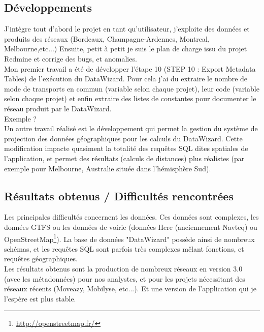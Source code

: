 \begin{itemize}
\subsection{Développements}

J'intègre tout d'abord le projet en tant qu'utilisateur, j'exploite des données et produits des réseaux (Bordeaux, Champagne-Ardennes, Montreal, Melbourne,etc...) Ensuite, petit à petit je suis le plan de charge issu du projet Redmine et corrige des bugs, et anomalies.\\

Mon premier travail a été de développer l'étape 10 (STEP 10 : Export Metadata Tables) de l'exécution du DataWizard. Pour cela j'ai du extraire le nombre de mode de transports en commun (variable selon chaque projet), leur code (variable selon chaque projet) et enfin extraire des listes de constantes pour documenter le réseau produit par le DataWizard.\\

Exemple ?\\

Un autre travail réalisé est le développement qui permet la gestion du système de projection des données géographiques pour les calculs du DataWizard. Cette modification impacte quasiment la totalité des requêtes SQL dites spatiales de l'application, et permet des résultats (calculs de distances) plus réalistes (par exemple pour Melbourne, Australie située dans l'hémisphère Sud).\\


\subsection{Résultats obtenus / Difficultés rencontrées}

Les principales difficultés concernent les données. Ces données sont complexes, les données GTFS ou les données de voirie (données Here (anciennement Navteq) ou OpenStreetMap\footnote{\url{http://openstreetmap.fr/}}). La base de données "DataWizard" possède ainsi de nombreux schémas, et les requêtes SQL sont parfois très complexes mêlant fonctions, et requêtes géographiques.\\

Les résultats obtenus sont la production de nombreux réseaux en version 3.0 (avec les métadonnées) pour nos analystes, et pour les projets nécessitant des réseaux récents (Moveazy, Mobilyse, etc...). Et une version de l'application qui je l'espère est plus stable.\\


\end{itemize}
